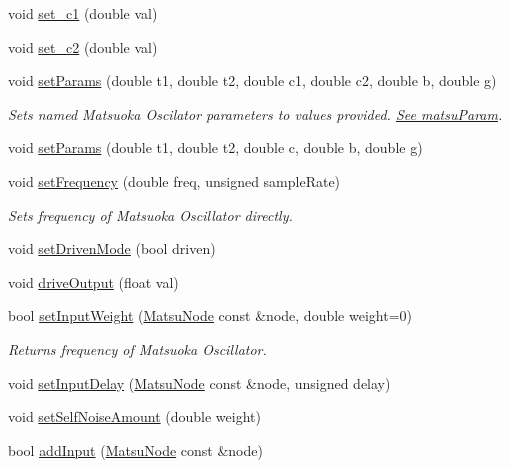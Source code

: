 \begin{DoxyCompactItemize}
void \hyperlink{classMatsuNode_ac73855b7037577ed6c06dce868d8ab5b}{set\+\_\+c1} (double val)
\item 
void \hyperlink{classMatsuNode_a6bea0b2a8d747f389ceaeb1374e96398}{set\+\_\+c2} (double val)
\item 
void \hyperlink{classMatsuNode_a15b6cfcaa1e20abf04c7c18da3881d60}{set\+Params} (double t1, double t2, double c1, double c2, double b, double g)
\begin{DoxyCompactList}\small\item\em Sets named Matsuoka Oscilator parameters to values provided. \hyperlink{classMatsuNode_aed801e1d0363292efc99bb02f1911386}{See matsu\+Param}. \end{DoxyCompactList}\item 
void \hyperlink{classMatsuNode_ab240f6a290cf33356d9df8fce58633ab}{set\+Params} (double t1, double t2, double c, double b, double g)
\item 
void \hyperlink{classMatsuNode_adb33b1e7dcfaf786be5d99627bca1c14}{set\+Frequency} (double freq, unsigned sample\+Rate)
\begin{DoxyCompactList}\small\item\em Sets frequency of Matsuoka Oscillator directly. \end{DoxyCompactList}\item 
void \hyperlink{classMatsuNode_a62c5dce090102df22142da5cdad313e1}{set\+Driven\+Mode} (bool driven)
\item 
void \hyperlink{classMatsuNode_a64f8db81c0a5df5d7261b36640b399d4}{drive\+Output} (float val)
\item 
bool \hyperlink{classMatsuNode_af8ebc02ac8a69c9ecbb41fa22434a986}{set\+Input\+Weight} (\hyperlink{classMatsuNode}{Matsu\+Node} const \&node, double weight=0)
\begin{DoxyCompactList}\small\item\em Returns frequency of Matsuoka Oscillator. \end{DoxyCompactList}\item 
void \hyperlink{classMatsuNode_a180df69fa13bbb8a0ad1ec56219b540c}{set\+Input\+Delay} (\hyperlink{classMatsuNode}{Matsu\+Node} const \&node, unsigned delay)
\item 
void \hyperlink{classMatsuNode_abc2600fa8de6d090296ee5f152a01916}{set\+Self\+Noise\+Amount} (double weight)
\item 
bool \hyperlink{classMatsuNode_a1eb3cb48dd269efdb5f629f363380fb6}{add\+Input} (\hyperlink{classMatsuNode}{Matsu\+Node} const \&node)
\item 

\end{DoxyCompactItemize}
